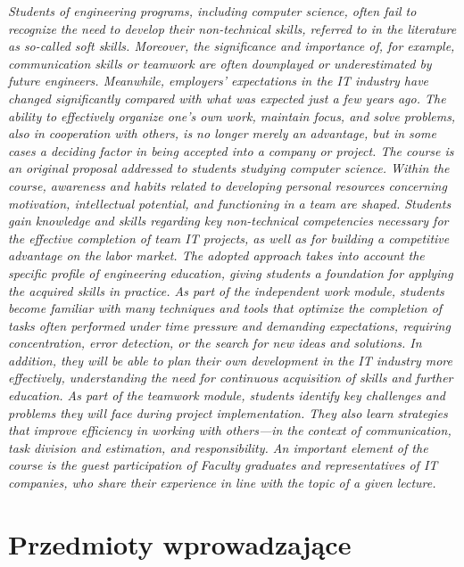 \documentclass[12pt, a4paper]{article}
\begin{document}
\textit{Students of engineering programs, including computer science, often fail to recognize the need to develop their non-technical skills, referred to in the literature as so-called soft skills. Moreover, the significance and importance of, for example, communication skills or teamwork are often downplayed or underestimated by future engineers. Meanwhile, employers’ expectations in the IT industry have changed significantly compared with what was expected just a few years ago. The ability to effectively organize one’s own work, maintain focus, and solve problems, also in cooperation with others, is no longer merely an advantage, but in some cases a deciding factor in being accepted into a company or project. The course is an original proposal addressed to students studying computer science. Within the course, awareness and habits related to developing personal resources concerning motivation, intellectual potential, and functioning in a team are shaped. Students gain knowledge and skills regarding key non-technical competencies necessary for the effective completion of team IT projects, as well as for building a competitive advantage on the labor market. The adopted approach takes into account the specific profile of engineering education, giving students a foundation for applying the acquired skills in practice. As part of the independent work module, students become familiar with many techniques and tools that optimize the completion of tasks often performed under time pressure and demanding expectations, requiring concentration, error detection, or the search for new ideas and solutions. In addition, they will be able to plan their own development in the IT industry more effectively, understanding the need for continuous acquisition of skills and further education. As part of the teamwork module, students identify key challenges and problems they will face during project implementation. They also learn strategies that improve efficiency in working with others—in the context of communication, task division and estimation, and responsibility. An important element of the course is the guest participation of Faculty graduates and representatives of IT companies, who share their experience in line with the topic of a given lecture.}


\section{Przedmioty wprowadzające}
\end{document}
